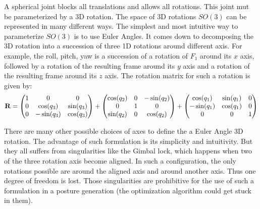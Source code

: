 A spherical joint blocks all translations and allows all rotations. This joint mut be parameterized by a 3D rotation. The space of 3D rotations $SO(3)$ can be represented in many different ways.
The simplest and most intuitive way to parameterize $SO(3)$ is to use Euler Angles.
It comes down to decomposing the 3D rotation into a succession of three 1D rotations around different axis.
For example, the roll, pitch, yaw is a succession of a rotation of $F_1$ around its $x$ axis, followed by a rotation of the resulting frame around its $y$ axis and a rotation of the resulting frame around its $z$ axis.
The rotation matrix for such a rotation is given by:
\begin{equation}
  \bf{R} =
  \begin{pmatrix}
    1 & 0 & 0 \\
    0 & \cos(q_3) & \sin(q_3) \\
    0 & -\sin(q_3) & \cos(q_3) \\
  \end{pmatrix}
  +
  \begin{pmatrix}
    \cos(q_2) & 0 & -\sin(q_2) \\
    0 & 1 & 0 \\
    \sin(q_2) & 0 & \cos(q_2) \\
  \end{pmatrix}
  +
  \begin{pmatrix}
    \cos(q_1) & \sin(q_1) & 0 \\
    -\sin(q_1) & \cos(q_1) & 0 \\
    0 & 0 & 1
  \end{pmatrix}
\end{equation}

There are many other possible choices of axes to define the a Euler Angle 3D rotation.
The advantage of such formulation is its simplicity and intuitivity.
But they all suffers from singularities like the Gimbal lock, which happens when two of the three rotation axis become aligned.
In such a configuration, the only rotations possible are around the aligned axis and around another axis.
Thus one degree of freedom is lost.
Those singularities are prohibitive for the use of such a formulation in a posture generation (the optimization algorithm could get stuck in them).

